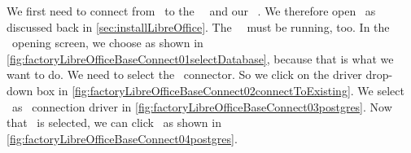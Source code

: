 %
%
\FloatBarrier%
%
%
We first need to connect from \libreofficeBase\ to the \postgresql\ \server\ and our ~\db.
We therefore open \libreofficeBase\ as discussed back in \cref{sec:installLibreOffice}.
The \postgresql\ \server\ must be running, too.
In the \libreofficeBase\ opening screen, we choose  as shown in \cref{fig:factoryLibreOfficeBaseConnect01selectDatabase}, because that is what we want to do.
We need to select the \postgresql\ connector.
So we click on the driver drop-down box in \cref{fig:factoryLibreOfficeBaseConnect02connectToExisting}.
We select \postgresql\ as \db\ connection driver in \cref{fig:factoryLibreOfficeBaseConnect03postgres}.
Now that \postgresql\ is selected, we can click~ as shown in \cref{fig:factoryLibreOfficeBaseConnect04postgres}.

